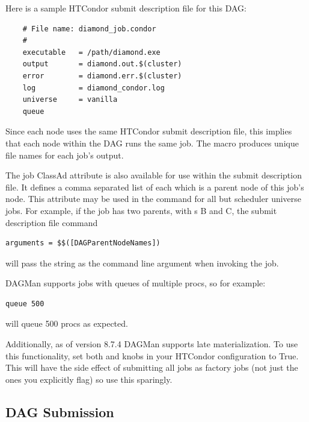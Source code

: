 Here is a sample HTCondor submit description file
for this DAG:

\begin{verbatim}
    # File name: diamond_job.condor
    #
    executable   = /path/diamond.exe
    output       = diamond.out.$(cluster)
    error        = diamond.err.$(cluster)
    log          = diamond_condor.log
    universe     = vanilla
    queue
\end{verbatim}

Since each node uses the same HTCondor submit description file,
this implies that each node within the DAG runs the
same job.
The  macro
produces unique file names for each job's output.

The job ClassAd attribute  is also available
for use within the submit description file. 
It defines a comma separated list of each 
which is a parent node of this job's node.
This attribute may be used in the  command
for all but scheduler universe jobs.
For example, if the job has two parents, with s B and C,
the submit description file command
\begin{verbatim}
arguments = $$([DAGParentNodeNames])
\end{verbatim}
will pass the string  as the command line argument when invoking
the job.

DAGMan supports jobs with queues of multiple procs, so for example:
\begin{verbatim}
queue 500
\end{verbatim}
will queue 500 procs as expected. 

Additionally, as of version 8.7.4 DAGMan supports late materialization. To use
this functionality, set both  
and  knobs in your HTCondor
configuration to True. This will have the side effect of submitting all jobs as
factory jobs (not just the ones you explicitly flag) so use this sparingly.

\subsection{\label{dagman:submitdag}DAG Submission}


